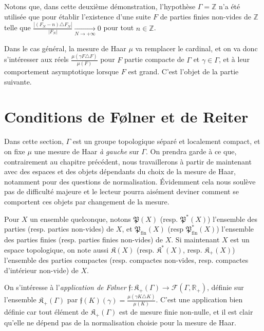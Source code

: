 \documentclass[a4paper,12pt]{article}
\newcommand{\R}{\mathbb{R}}
\newcommand{\Z}{\mathbb{Z}}
\newcommand{\abs}[1]{\left\vert#1\right\vert}
\newcommand{\card}[1]{\abs{#1}}
\newcommand{\parts}{\mathfrak{P}}
\newcommand{\finparts}{\mathfrak{P}_{\mathrm{fin}}}
\begin{document}
Notons que, dans cette deuxième démonstration, l'hypothèse $\Gamma=\Z$ n'a été utilisée que pour établir l'existence d'une suite $F$ 
de parties finies non-vides de $\Z$
telle que $\frac{\card{(F_N-n)\triangle F_N}}{\card{F_N}} \xrightarrow[N\to+\infty]{} 0$ pour tout $n\in\Z$. 

Dans le cas général, la mesure de Haar $\mu$ va remplacer le cardinal, et on va donc s'intéresser aux réels $\frac{\mu(\gamma F \triangle F)}{\mu(F)}$ 
pour $F$ partie compacte de $\Gamma$ et $\gamma\in\Gamma$, et à leur comportement asymptotique
lorsque $F$ est grand. C'est l'objet de la partie suivante.

\section{Conditions de F\o{}lner et de Reiter}

Dans cette section, $\Gamma$ est un groupe topologique séparé et localement compact, et on fixe 
$\mu$ une mesure de Haar \emph{à gauche} sur $\Gamma$. On prendra garde à ce que, contrairement au chapitre précédent,
nous travaillerons à partir de maintenant avec des espaces et des objets dépendants du choix de la mesure de Haar,
notamment pour des questions de normalisation. Évidemment cela nous soulève pas de difficulté majeure et 
le lecteur pourra aisément deviner comment se comportent ces objets par changement de la mesure.

Pour $X$ un ensemble quelconque, notons $\parts(X)$ (resp. $\parts^*(X)$) l'ensemble des parties (resp. parties non-vides) de $X$, et $\finparts(X)$ (resp $\finparts^*(X)$) 
l'ensemble des parties finies (resp. parties finies non-vides) de $X$. Si maintenant $X$ est un espace topologique, 
on note aussi $\mathfrak{K}(X)$ (resp. $\mathfrak{K}^*(X)$, resp. $\mathfrak{K}_+(X)$) l'ensemble des parties compactes 
(resp. compactes non-vides, resp. compactes d'intérieur non-vide) de $X$. 

On s'intéresse à l'\emph{application de F\o{}lner} $\mathfrak{f} : \mathfrak{K}_+(\Gamma) \to \mathcal{F}(\Gamma, \R_+)$, définie sur l'ensemble 
$\mathfrak{K}_+(\Gamma)$ par $\mathfrak{f}(K)(\gamma) = \frac{\mu(\gamma K \triangle K)}{\mu(K)}$.
C'est une application bien définie car tout élément de $\mathfrak{K}_+(\Gamma)$ est de mesure finie non-nulle,
et il est clair qu'elle ne dépend pas de la normalisation choisie pour la mesure de Haar.
\end{document}
